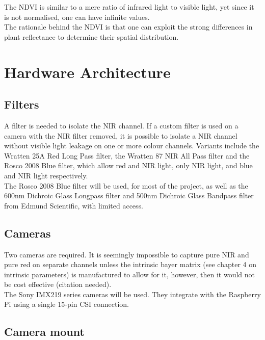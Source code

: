 The NDVI is similar to a mere ratio of infrared light to visible light, yet since it is not normalised, one can have infinite values.\\

The rationale behind the NDVI is that one can exploit the strong differences in plant reflectance to determine their spatial distribution.\\

\section{Hardware Architecture}

\subsection{Filters}

A filter is needed to isolate the NIR channel. If a custom filter is used on a camera with the NIR filter removed, it is possible to isolate a NIR channel without visible light leakage on one or more colour channels. Variants include the Wratten 25A Red Long Pass filter, the Wratten 87 NIR All Pass filter and the Rosco 2008 Blue filter, which allow red and NIR light, only NIR light, and blue and NIR light respectively.\\

The Rosco 2008 Blue filter will be used, for most of the project, as well as the 600nm Dichroic Glass Longpass filter and 500nm Dichroic Glass Bandpass filter from Edmund Scientific, with limited access.

\subsection{Cameras}

Two cameras are required. It is seemingly impossible to capture pure NIR and pure red on separate channels unless the intrinsic bayer matrix (see chapter 4 on intrinsic parameters) is manufactured to allow for it, however, then it would not be cost effective (citation needed).\\

The Sony IMX219 series cameras will be used. They integrate with the Raspberry Pi using a single 15-pin CSI connection.

\subsection{Camera mount}

